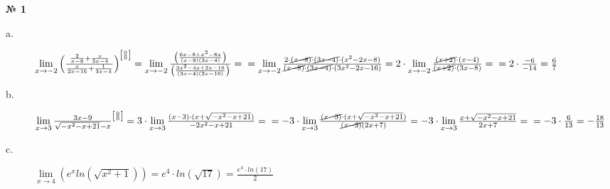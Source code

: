 \documentclass[12pt]{article}
\newenvironment{task}[1][0]{\vspace{.5cm} {\textbf{№ #1} \vspace{.5cm}\\ }\large}{}
\begin{document}
\begin{task}[1]
\begin{description}
	\item[a.]{
\Large{$\lim\limits_{x \to -2} \left(\frac{\frac{2}{x-8}+\frac{x}{3x-4}}{\frac{x}{2x-16} + \frac{1}{3x-4}}\right)^{\left[\frac{0}{0}\right]} = \lim\limits_{x \to -2} \frac{\left(\frac{6x-8 + x^2-8x}{(x-8)(3x-4)}\right)}{\left(\frac{3x^2-4x+2x-16}{(3x-4)(2x-16)}\right)}=\\=\lim\limits_{x \to -2}
	\frac{2 \cdot \cancel{(x-8)} \cdot \cancel{(3x-4)} \cdot (x^2-2x-8)}{\cancel{(x-8)} \cdot \cancel{(3x-4)} \cdot (3x^2-2x-16)} =2 \cdot \lim\limits_{x \to -2} \frac{\cancel{(x+2)} \cdot (x-4)}{\cancel{(x+2)} \cdot (3x-8)} =\\= 2 \cdot \frac{-6}{-14} = \frac{6}{7}$}
}
\item[b.]{
\Large{$\lim\limits_{x \to 3} \frac{3x-9}{\sqrt{-x^2-x+21}-x}^{\left[\frac{0}{0}\right]} = 
3 \cdot \lim\limits_{x \to 3} \frac{(x-3) \cdot (x + \sqrt{-x^2-x+21})}{-2x^2-x+21} =\\=
-3 \cdot \lim\limits_{x \to 3} \frac{\cancel{(x-3)} \cdot (x + \sqrt{-x^2-x+21})}{\cancel{(x-3)}(2x+7)} = -3 \cdot \lim\limits_{x \to 3} \frac{x + \sqrt{-x^2-x+21}}{2x+7} =\\= -3 \cdot \frac{6}{13} = -\frac{18}{13}$}
}
\item[c.]{
$\lim\limits_{x \to 4} \left(e^x ln(\sqrt{x^2+1})\right) = e^4 \cdot ln(\sqrt{17})=\frac{e^4 \cdot ln(17)}{2}$\\
}
\end{description}
\end{task}
\end{document}
